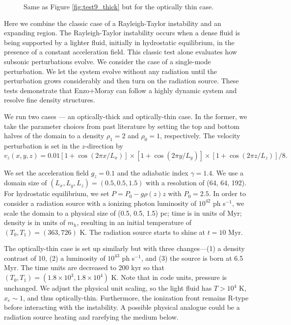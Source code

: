 \documentclass[apj,onecolumn]{emulateapj}
\begin{document}
\begin{figure}[t]
  \caption{\label{fig:test9_thin} Same as Figure \ref{fig:test9_thick}
    but for the optically thin case.}
\end{figure}

Here we combine the classic case of a Rayleigh-Taylor instability and
an expanding  region.  The Rayleigh-Taylor instability
occurs when a dense fluid is being supported by a lighter fluid,
initially in hydrostatic equilibrium, in the presence of a constant
acceleration field.  This classic test alone evaluates how subsonic
perturbations evolve.  We consider the case of a single-mode
perturbation.  We let the system evolve without any radiation until
the perturbation grows considerably and then turn on the radiation
source.  These tests demonstrate that Enzo+Moray can follow a highly
dynamic system and resolve fine density structures.

We run two cases --- an optically-thick and optically-thin case.  In
the former, we take the parameter choices from past literature
\citep[e.g.][]{Liska03, Stone08} by setting the top and bottom halves
of the domain to a density $\rho_1 = 2$ and $\rho_0 = 1$,
respectively.  The velocity perturbation is set in the $z$-direction
by
\begin{equation}
  v_z(x,y,z) = 0.01 [1 + \cos(2\pi x / L_x)] \times 
  [1 + \cos(2\pi y / L_y)] \times [1 + \cos(2\pi z / L_z)]/8.
\end{equation}

We set the acceleration field $g_z = 0.1$ and the adiabatic index
$\gamma = 1.4$.  We use a domain size of $(L_x, L_y, L_z) = (0.5, 0.5,
1.5)$ with a resolution of (64, 64, 192).  For hydrostatic equilibrium,
we set $P = P_0 - g \rho(z) z$ with $P_0 = 2.5$.  In order to consider
a radiation source with a ionizing photon luminosity of $10^{42}$ ph
s$^{-1}$, we scale the domain to a physical size of (0.5, 0.5, 1.5)
pc; time is in units of Myr; density is in units of $m_h$, resulting
in an initial temperature of $(T_0, T_1) = (363, 726)$ K.  The
radiation source starts to shine at $t = 10$ Myr.

The optically-thin case is set up similarly but with three
changes---(1) a density contrast of 10, (2) a luminosity of $10^{43}$
ph s$^{-1}$, and (3) the source is born at 6.5 Myr.  The time units
are decreased to 200 kyr so that $(T_0, T_1) = (1.8 \times 10^3, 1.8
\times 10^4)$ K.  Note that in code units, pressure is unchanged.  We
adjust the physical unit scaling, so the light fluid has $T > 10^4$ K,
$x_e \sim 1$, and thus optically-thin.  Furthermore, the ionization
front remains R-type before interacting with the instability.  A
possible physical analogue could be a radiation source heating and
rarefying the medium below.
\end{document}
